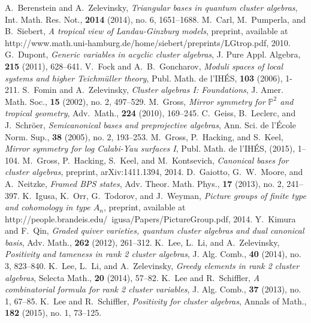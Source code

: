 \documentclass[10pt]{amsart}
\theoremstyle{remark}
\numberwithin{equation}{section}
\begin{document}
\begin{thebibliography}{99}
  
   A.~Berenstein and A.~Zelevinsky, \emph{Triangular bases in quantum cluster algebras}, Int. Math. Res. Not., \textbf{2014} (2014), no. 6, 1651--1688.
   M.~Carl, M.~Pumperla, and B.~Siebert, \emph{A tropical view of Landau-Ginzburg models}, preprint, available at http://www.math.uni-hamburg.de/home/siebert/preprints/LGtrop.pdf, 2010.
   G.~Dupont, \emph{Generic variables in acyclic cluster algebras}, J. Pure Appl. Algebra, \textbf{215} (2011), 628--641.
   V.~Fock and A.~B.~Goncharov, \emph{Moduli spaces of local systems and higher Teichm\"{u}ller theory}, Publ. Math. de l'IH\'{E}S, {\bf 103} (2006), 1-211.
   S.~Fomin and A.~Zelevinsky, \emph{Cluster algebras I: Foundations},  J. Amer. Math. Soc., \textbf{15} (2002), no. 2, 497--529.
   M.~Gross,  \emph{Mirror symmetry for $\mathbb{P}^2$ and tropical geometry}, Adv.\ Math., {\bf 224} (2010), 169--245. 
   C.~Geiss, B.~Leclerc, and J.~Schr\"{o}er, \emph{Semicanonical bases and preprojective algebras}, Ann. Sci. de l'\'{E}cole Norm. Sup., {\bf 38} (2005), no. 2, 193--253.
   M.~Gross, P.~Hacking, and S.~Keel, \emph{Mirror symmetry for log Calabi-Yau surfaces I}, Publ. Math. de l'IH\'{E}S, (2015), 1--104.
   M.~Gross, P.~Hacking, S.~Keel, and M.~Kontsevich, \emph{Canonical bases for cluster algebras}, preprint, arXiv:1411.1394, 2014.
   D.~Gaiotto, G.~W.~Moore, and A.~Neitzke, \emph{Framed BPS states}, Adv. Theor. Math. Phys., {\bf 17} (2013), no. 2, 241--397.
   K.~Igusa, K.~Orr, G.~Todorov, and J.~Weyman, \emph{Picture groups of finite type and cohomology in type $A_n$}, preprint, available at http://people.brandeis.edu/~igusa/Papers/PictureGroup.pdf, 2014.
   Y.~Kimura and F.~Qin, \emph{Graded quiver varieties, quantum cluster algebras and dual canonical basis}, Adv. Math., {\bf 262} (2012), 261--312.
   K.~Lee, L.~Li, and A.~Zelevinsky, \emph{Positivity and tameness in rank 2 cluster algebras}, J. Alg. Comb., {\bf 40} (2014), no. 3, 823--840.
   K.~Lee, L.~Li, and A.~Zelevinsky, \emph{Greedy elements in rank 2 cluster algebras}, Selecta Math., \textbf{20} (2014), 57--82.
   K.~Lee and R.~Schiffler, \emph{A combinatorial formula for rank 2 cluster variables}, J. Alg. Comb., {\bf 37} (2013), no. 1, 67--85.
   K.~Lee and R.~Schiffler, \emph{Positivity for cluster algebras}, Annals of Math., {\bf 182} (2015), no. 1, 73--125.

\end{thebibliography}
\end{document}
